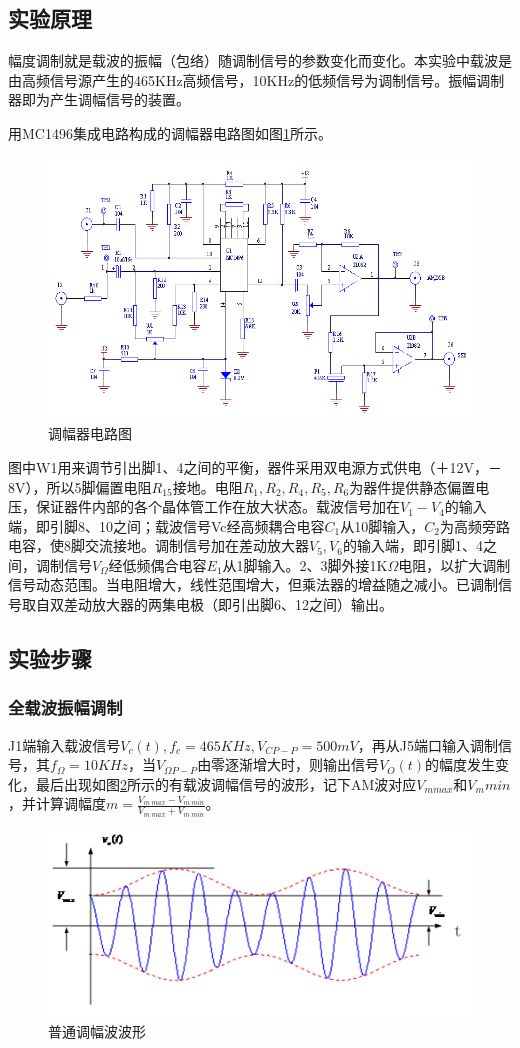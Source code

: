 \documentclass[12pt]{article}%
\numberwithin{equation}{section}
\begin{document}
\subsection{实验原理}
幅度调制就是载波的振幅（包络）随调制信号的参数变化而变化。本实验中载波是由高频信号源产生的465KHz高频信号，10KHz的低频信号为调制信号。振幅调制器即为产生调幅信号的装置。\par
用MC1496集成电路构成的调幅器电路图如图\ref{img:AM}所示。\par
       \begin{figure}[htbp]
  \centering
  \includegraphics[width=\textwidth]{image017.png} 
  \caption{ 调幅器电路图} 
  \label{img:AM} 
\end{figure}
图中W1用来调节引出脚1、4之间的平衡，器件采用双电源方式供电（＋12V，－8V），所以5脚偏置电阻$R_{15}$接地。电阻$R_1,R_2,R_4,R_5,R_6$为器件提供静态偏置电压，保证器件内部的各个晶体管工作在放大状态。载波信号加在$V_1-V_4$的输入端，即引脚8、10之间；载波信号Vc经高频耦合电容$C_1$从10脚输入，$C_2$为高频旁路电容，使8脚交流接地。调制信号加在差动放大器$V_5,V_6$的输入端，即引脚1、4之间，调制信号$V_\Omega$经低频偶合电容$E_1$从1脚输入。2、3脚外接1K$\Omega$电阻，以扩大调制信号动态范围。当电阻增大，线性范围增大，但乘法器的增益随之减小。已调制信号取自双差动放大器的两集电极（即引出脚6、12之间）输出。
\subsection{实验步骤}
\subsubsection{全载波振幅调制}
 J1端输入载波信号$V_c(t) , f_c=465KHz, V_{CP-P}=500mV$，再从J5端口输入调制信号，其$f_\Omega=10KHz$，当$V_{\Omega P-P}$由零逐渐增大时，则输出信号$V_O(t)$的幅度发生变化，最后出现如图\ref{img:AMp}所示的有载波调幅信号的波形，记下AM波对应$V_{mmax}$和$V_mmin$，并计算调幅度$m=\frac{V_{m\ max}-V_{m\ min}}{V_{m\ max}+V_{m\ min}}$。
       \begin{figure}[htbp]
  \centering
  \includegraphics[width=.5\textwidth]{image019.png} 
  \caption{ 普通调幅波波形} 
  \label{img:AMp} 
\end{figure}
\end{document}
